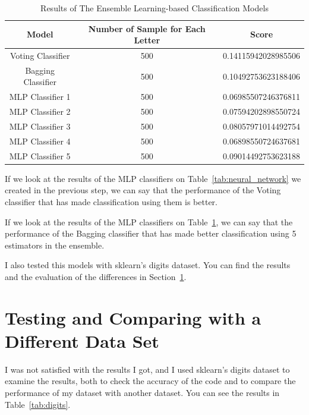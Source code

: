 \documentclass{article}
\begin{document}
\begin{flushleft}
\begin{table}[h]
    \centering
    \begin{tabular}{c|c|c}
    \hline
        Model & Number of Sample for Each Letter & Score \\
    \hline
         Voting Classifier & 500 & 0.14115942028985506 \\
         Bagging Classifier & 500 & 0.10492753623188406 \\
         MLP Classifier 1 & 500 & 0.06985507246376811  \\
         MLP Classifier 2 & 500 & 0.07594202898550724  \\
         MLP Classifier 3 & 500 & 0.08057971014492754  \\
         MLP Classifier 4 & 500 & 0.06898550724637681  \\
         MLP Classifier 5 & 500 & 0.09014492753623188  \\
    \hline
    \end{tabular}
    \caption{Results of The Ensemble Learning-based Classification Models}
    \label{tab:ensemble}
\end{table}

If we look at the results of the MLP classifiers on Table~\ref{tab:neural_network} we created in the previous step, we can say that the performance of the Voting classifier that has made classification using them is better.

If we look at the results of the MLP classifiers on Table~\ref{tab:ensemble}, we can say that the performance of the Bagging classifier that has made better classification using 5 estimators in the ensemble.

I also tested this models with sklearn's digits dataset. You can find the results and the evaluation of the differences in Section~\ref{testing_on_digits}.


\section{Testing and Comparing with a Different Data Set}
\label{testing_on_digits}

I was not satisfied with the results I got, and I used sklearn's digits dataset to examine the results, both to check the accuracy of the code and to compare the performance of my dataset with another dataset. You can see the results in Table~\ref{tab:digits}.


\end{flushleft}
\end{document}

